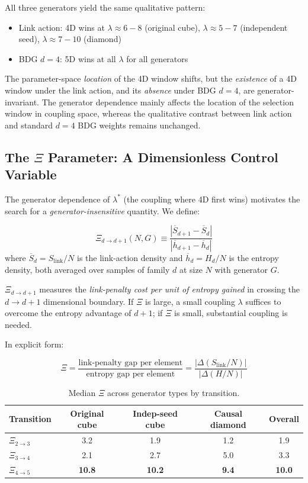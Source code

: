 \documentclass[12pt,a4paper]{article}
\begin{document}
All three generators yield the same qualitative pattern:
\begin{itemize}
  \item Link action: 4D wins at $\lambda \approx 6{-}8$ (original cube), $\lambda \approx 5{-}7$ (independent seed), $\lambda \approx 7{-}10$ (diamond)
  \item BDG $d{=}4$: 5D wins at all $\lambda$ for all generators
\end{itemize}

The parameter-space \emph{location} of the 4D window shifts, but the \emph{existence}
of a 4D window under the link action, and its \emph{absence} under BDG $d{=}4$,
are generator-invariant.
The generator dependence mainly affects the location of the selection window in
coupling space, whereas the qualitative contrast between link action and standard
$d{=}4$ BDG weights remains unchanged.

\subsection{The $\Xi$ Parameter: A Dimensionless Control Variable}
\label{sec:xi_parameter}

The generator dependence of $\lambda^*$ (the coupling where 4D first wins) motivates the
search for a \emph{generator-insensitive} quantity. We define:

\begin{equation}
\boxed{
\Xi_{d \to d+1}(N, G) \equiv \frac{|\overline{S}_{d+1} - \overline{S}_d|}{|\overline{h}_{d+1} - \overline{h}_d|}
}
\label{eq:xi_def}
\end{equation}
where $\overline{S}_d = S_\text{link}/N$ is the link-action density and
$\overline{h}_d = H_d / N$ is the entropy density,
both averaged over samples of family $d$ at size $N$ with generator $G$.

$\Xi_{d \to d+1}$ measures the \emph{link-penalty cost per unit of entropy gained}
in crossing the $d \to d{+}1$ dimensional boundary.
If $\Xi$ is large, a small coupling $\lambda$ suffices to overcome the entropy advantage
of $d{+}1$; if $\Xi$ is small, substantial coupling is needed.

In explicit form:

\begin{equation}
\Xi = \frac{\text{link-penalty gap per element}}{\text{entropy gap per element}}
    = \frac{|\Delta(S_\text{link}/N)|}{|\Delta(H / N)|}
\end{equation}

\begin{table}[htbp]
\centering
\caption{Median $\Xi$ across generator types by transition.}
\label{tab:xi_generators}
\begin{tabular}{@{}lcccc@{}}
\toprule
Transition & Original cube & Indep-seed cube & Causal diamond & Overall \\
\midrule
$\Xi_{2 \to 3}$ & 3.2 & 1.9 & 1.2 & 1.9 \\
$\Xi_{3 \to 4}$ & 2.1 & 2.7 & 5.0 & 3.3 \\
$\Xi_{4 \to 5}$ & \textbf{10.8} & \textbf{10.2} & \textbf{9.4} & \textbf{10.0} \\
\bottomrule
\end{tabular}
\end{table}
\end{document}
